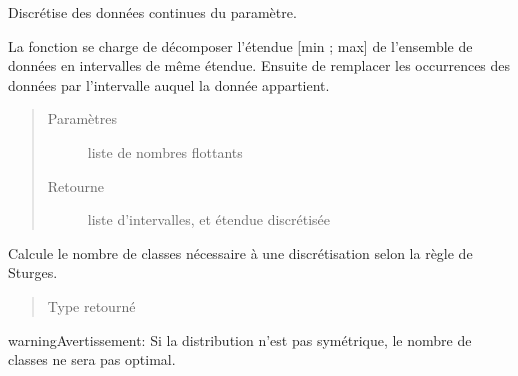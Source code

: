 \documentclass[letterpaper,10pt,openany,oneside,french]{sphinxmanual}
\begin{document}
\begin{fulllineitems}
\label{\detokenize{addQuantitativesContinues:add.addQuantitativesContinues.discretisation}}
Discrétise des données continues du paramètre.

La fonction se charge de décomposer l’étendue {[}min ; max{]} de l’ensemble de données en  intervalles de même étendue.
Ensuite de remplacer les occurrences des données par l’intervalle auquel la donnée appartient.
\begin{quote}\begin{description}
\item[{Paramètres}] \leavevmode
{} \textendash{} liste de nombres flottants

\item[{Retourne}] \leavevmode
liste d’intervalles, et étendue discrétisée

\end{description}\end{quote}

\end{fulllineitems}


\begin{fulllineitems}
\label{\detokenize{addQuantitativesContinues:add.addQuantitativesContinues.calculNombreClasses}}
Calcule le nombre de classes nécessaire à une discrétisation selon la règle de Sturges.
\begin{quote}\begin{description}
\item[{Type retourné}] \leavevmode
{}

\end{description}\end{quote}

\begin{sphinxadmonition}{warning}{Avertissement:}
Si la distribution n’est pas symétrique, le nombre de classes ne sera pas optimal.
\end{sphinxadmonition}

\end{fulllineitems}
\end{document}
